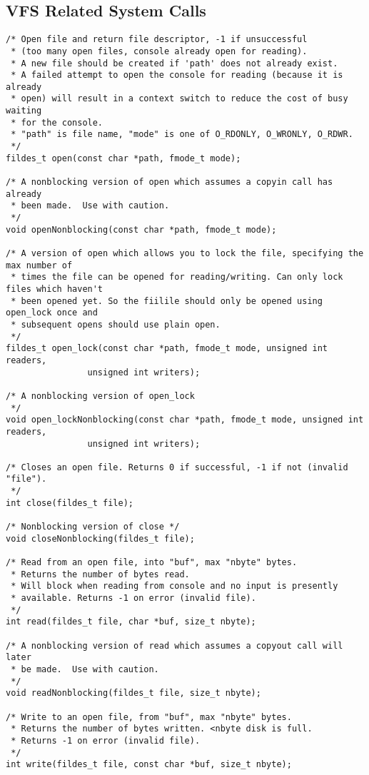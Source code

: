 \documentclass[12pt,english]{article}
\begin{document}
\subsection{VFS Related System Calls} \label{syscalls:vfs}

\begin{verbatim}
/* Open file and return file descriptor, -1 if unsuccessful 
 * (too many open files, console already open for reading).
 * A new file should be created if 'path' does not already exist.
 * A failed attempt to open the console for reading (because it is already
 * open) will result in a context switch to reduce the cost of busy waiting
 * for the console.
 * "path" is file name, "mode" is one of O_RDONLY, O_WRONLY, O_RDWR.
 */
fildes_t open(const char *path, fmode_t mode);

/* A nonblocking version of open which assumes a copyin call has already
 * been made.  Use with caution.
 */
void openNonblocking(const char *path, fmode_t mode);

/* A version of open which allows you to lock the file, specifying the max number of
 * times the file can be opened for reading/writing. Can only lock files which haven't
 * been opened yet. So the fiilile should only be opened using open_lock once and
 * subsequent opens should use plain open.
 */
fildes_t open_lock(const char *path, fmode_t mode, unsigned int readers,
                unsigned int writers);

/* A nonblocking version of open_lock
 */
void open_lockNonblocking(const char *path, fmode_t mode, unsigned int readers,
                unsigned int writers);

/* Closes an open file. Returns 0 if successful, -1 if not (invalid "file").
 */
int close(fildes_t file);

/* Nonblocking version of close */
void closeNonblocking(fildes_t file);

/* Read from an open file, into "buf", max "nbyte" bytes.
 * Returns the number of bytes read.
 * Will block when reading from console and no input is presently
 * available. Returns -1 on error (invalid file).
 */
int read(fildes_t file, char *buf, size_t nbyte);

/* A nonblocking version of read which assumes a copyout call will later
 * be made.  Use with caution.
 */
void readNonblocking(fildes_t file, size_t nbyte);

/* Write to an open file, from "buf", max "nbyte" bytes.
 * Returns the number of bytes written. <nbyte disk is full.
 * Returns -1 on error (invalid file).
 */
int write(fildes_t file, const char *buf, size_t nbyte);


\end{verbatim}
\end{document}
